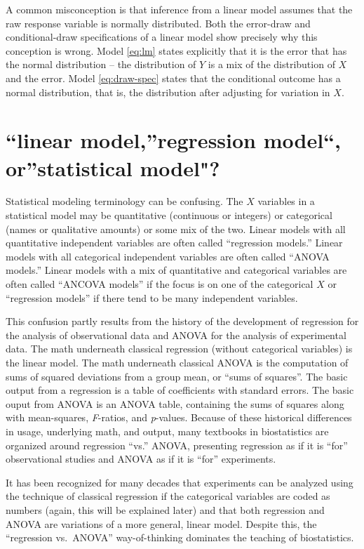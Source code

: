\documentclass[]{book}
\begin{document}
A common misconception is that inference from a linear model assumes that the raw response variable is normally distributed. Both the error-draw and conditional-draw specifications of a linear model show precisely why this conception is wrong. Model \eqref{eq:lm} states explicitly that it is the error that has the normal distribution -- the distribution of \(Y\) is a mix of the distribution of \(X\) and the error. Model \eqref{eq:draw-spec} states that the conditional outcome has a normal distribution, that is, the distribution after adjusting for variation in \(X\).

\hypertarget{linear-modelregression-model-orstatistical-model}{%
\section{``linear model,''regression model``, or''statistical model"?}\label{linear-modelregression-model-orstatistical-model}}

Statistical modeling terminology can be confusing. The \(X\) variables in a statistical model may be quantitative (continuous or integers) or categorical (names or qualitative amounts) or some mix of the two. Linear models with all quantitative independent variables are often called ``regression models.'' Linear models with all categorical independent variables are often called ``ANOVA models.'' Linear models with a mix of quantitative and categorical variables are often called ``ANCOVA models'' if the focus is on one of the categorical \(X\) or ``regression models'' if there tend to be many independent variables.

This confusion partly results from the history of the development of regression for the analysis of observational data and ANOVA for the analysis of experimental data. The math underneath classical regression (without categorical variables) is the linear model. The math underneath classical ANOVA is the computation of sums of squared deviations from a group mean, or ``sums of squares''. The basic output from a regression is a table of coefficients with standard errors. The basic ouput from ANOVA is an ANOVA table, containing the sums of squares along with mean-squares, \emph{F}-ratios, and \emph{p}-values. Because of these historical differences in usage, underlying math, and output, many textbooks in biostatistics are organized around regression ``vs.'' ANOVA, presenting regression as if it is ``for'' observational studies and ANOVA as if it is ``for'' experiments.

It has been recognized for many decades that experiments can be analyzed using the technique of classical regression if the categorical variables are coded as numbers (again, this will be explained later) and that both regression and ANOVA are variations of a more general, linear model. Despite this, the ``regression vs.~ANOVA'' way-of-thinking dominates the teaching of biostatistics.
\end{document}
